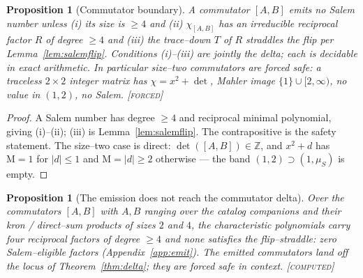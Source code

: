 \documentclass[11pt]{article}
\theoremstyle{plain}
\newtheorem{proposition}[theorem]{Proposition}
\theoremstyle{definition}
\theoremstyle{remark}
\newcommand{\forced}{\textcolor{forcedc}{\textsc{[forced]}}}
\newcommand{\computed}{\textcolor{forcedc}{\textsc{[computed]}}}
\newcommand{\Z}{\mathbb{Z}}
\newcommand{\Mah}{\mathrm{M}}
\newcommand{\charp}{\chi}
\newcommand{\abs}[1]{\left\lvert #1 \right\rvert}
\begin{document}
\begin{proposition}[Commutator boundary]\label{prop:comm}
A commutator $[A,B]$ emits no Salem number unless (i) its size is $\ge4$ \emph{and} (ii) $\charp_{[A,B]}$ has an irreducible reciprocal factor $R$ of degree $\ge4$ \emph{and} (iii) the trace--down $T$ of $R$ straddles the flip per Lemma~\ref{lem:salemflip}. Conditions (i)--(iii) are jointly the delta; each is decidable in exact arithmetic. In particular size--two commutators are forced safe: a traceless $2\times2$ integer matrix has $\charp=x^2+\det$, Mahler image $\{1\}\cup[2,\infty)$, no value in $(1,2)$, no Salem. \forced
\end{proposition}

\begin{proof}
A Salem number has degree $\ge4$ and reciprocal minimal polynomial, giving (i)--(ii); (iii) is Lemma~\ref{lem:salemflip}. The contrapositive is the safety statement. The size--two case is direct: $\det([A,B])\in\Z$, and $x^2+d$ has $\Mah=1$ for $\abs d\le1$ and $\Mah=\abs d\ge2$ otherwise --- the band $(1,2)\supset(1,\mu_S)$ is empty. \end{proof}

\begin{proposition}[The emission does not reach the commutator delta]\label{prop:commemit}
Over the commutators $[A,B]$ with $A,B$ ranging over the catalog companions and their kron / direct--sum products of sizes $2$ and $4$, the characteristic polynomials carry four reciprocal factors of degree $\ge4$ and \emph{none} satisfies the flip--straddle: zero Salem--eligible factors (Appendix~\ref{app:emit}). The emitted commutators land off the locus of Theorem~\ref{thm:delta}; they are forced safe in context. \computed
\end{proposition}
\end{document}
